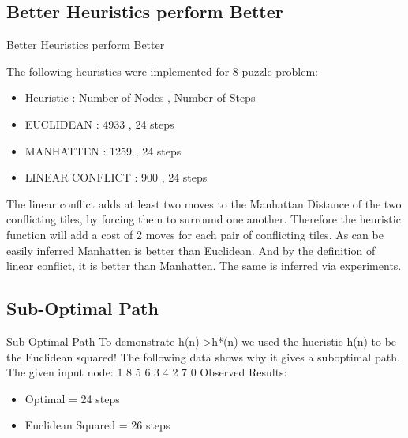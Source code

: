 \documentclass{beamer}
\begin{document}
\subsection{Better Heuristics perform Better}
\begin{frame}{Better Heuristics perform Better}

The following heuristics were implemented for 8 puzzle problem:
\begin{itemize}
\item Heuristic : Number of Nodes , Number of Steps
\item EUCLIDEAN : 4933 , 24 steps
\item MANHATTEN : 1259 , 24 steps
\item LINEAR CONFLICT : 900 , 24 steps 
\end{itemize}

The linear conflict adds at least two moves to the Manhattan Distance of the two conflicting tiles, by forcing them to surround one another. Therefore the heuristic function will add a cost of 2 moves for each pair of conflicting tiles.
\newline \newline
As can be easily inferred Manhatten is better than Euclidean. And by the definition of linear conflict, it is better than Manhatten.
\newline 
The same is inferred via experiments.
\end{frame}

\subsection{Sub-Optimal Path}
\begin{frame}{Sub-Optimal Path}
To demonstrate h(n)  \textgreater  h*(n) we used the hueristic h(n) to be the Euclidean squared! The following data shows why it gives a suboptimal path.
\newline
The given input node: 1 8 5 6 3 4 2 7 0 
\newline
Observed Results:
\begin{itemize}
\item Optimal = 24 steps
\item Euclidean Squared = 26 steps
\end{itemize}

\end{frame}
\end{document}
